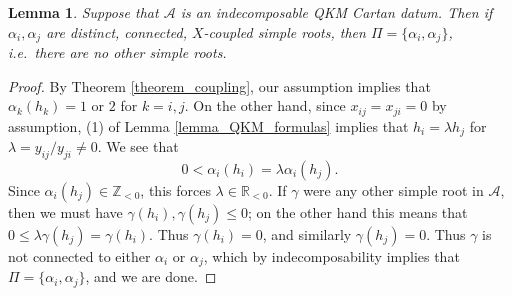 \documentclass[12pt, a4paper, reqno]{amsart}
\def\R{\mathbb{R}}
\def\Z{\mathbb{Z}}
\def\AA{\mathcal{A}}
\newtheorem{lemma}{Lemma}
\theoremstyle{definition}
\theoremstyle{definition}
\theoremstyle{definition}
\numberwithin{theorem}{section}
\numberwithin{lemma}{section}
\numberwithin{remark}{section}
\numberwithin{definition}{section}
\numberwithin{corollary}{section}
\numberwithin{proposition}{section}
\numberwithin{example}{section}
\begin{document}
	\begin{lemma}\label{lemma_X_coupling_isolated}
		Suppose that $\AA$ is an indecomposable QKM Cartan datum. Then if $\alpha_i,\alpha_j$ are distinct, connected, $X$-coupled simple roots, then $\Pi=\{\alpha_i,\alpha_j\}$, i.e.~there are no other simple roots.
	\end{lemma}
	\begin{proof}
		By Theorem \ref{theorem_coupling}, our assumption implies that $\alpha_k(h_k)=1$ or $2$ for $k=i,j$.  On the other hand, since $x_{ij}=x_{ji}=0$ by assumption, (1) of Lemma \ref{lemma_QKM_formulas} implies that $h_i=\lambda h_j$ for $\lambda=y_{ij}/y_{ji}\neq0$.  We see that
		\[
		0<\alpha_i(h_i)=\lambda\alpha_i(h_j).
		\]
		Since $\alpha_i(h_j)\in\Z_{<0}$, this forces $\lambda\in\R_{<0}$.  If $\gamma$ were any other simple root in $\AA$, then we must have $\gamma(h_i),\gamma(h_j)\leq0$; on the other hand this means that $0\leq \lambda\gamma(h_j)=\gamma(h_i)$.  Thus $\gamma(h_i)=0$, and similarly $\gamma(h_j)=0$.  Thus $\gamma$ is not connected to either $\alpha_i$ or $\alpha_j$, which by indecomposability implies that $\Pi=\{\alpha_i,\alpha_j\}$, and we are done.
	\end{proof}
\end{document}
